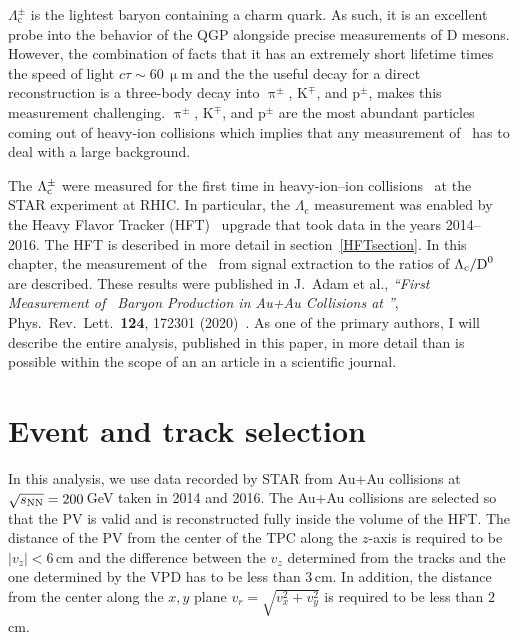         $\Lambda_\mathrm{c}^\pm$ is the lightest baryon containing a charm quark. As such, it is an excellent probe into the behavior of the QGP alongside precise measurements of D mesons. However, the combination of facts that it has an extremely short lifetime times the speed of light $c\tau \sim 60\,\upmu$m and the the useful decay for a direct reconstruction is a three-body decay into $\uppi^\pm$, K$^\mp$, and p$^\pm$, makes this measurement challenging. $\uppi^\pm$, K$^\mp$, and p$^\pm$ are the most abundant particles coming out of heavy-ion collisions which implies that any measurement of \Lambdacpm\ has to deal with a large background.

The ${\Lambda_\text{c}^\pm}$ were measured for the first time in heavy-ion--ion collisions~\cite{GuannanLc} at the STAR experiment at RHIC\@. In particular, the $\Lambda_\mathrm{c}$ measurement was enabled by the Heavy Flavor Tracker (HFT)~\cite{HFTLeo} upgrade that took data in the years 2014--2016\@. The HFT is described in more detail in section~\ref{HFTsection}\@. In this chapter, the measurement of the \Lambdac\ from signal extraction to the ratios of ${\Lambda_\text{c}}/{\text{D}^0}$ are described. These results were published in J.\ Adam et al., \emph{``First Measurement of \Lambdac\ Baryon Production in Au+Au Collisions at \snnFull''}, Phys.\ Rev.\ Lett.\ \textbf{124}, 172301 (2020)~\cite{LambdacPaper}\@. As one of the primary authors, I will describe the entire analysis, published in this paper, in more detail than is possible within the scope of an an article in a scientific journal.



\section{\label{eventAndTrackSelection}Event and track selection}
In this analysis, we use data recorded by STAR from Au+Au collisions at $\sqrt{s_\text{NN}} = 200\,$GeV taken in 2014 and 2016. The Au+Au collisions are selected so that the PV is valid and is reconstructed fully inside the volume of the HFT\@. The distance of the PV from the center of the TPC along the $z$-axis is required to be $|v_z| < 6\,$cm and the difference between the $v_z$ determined from the tracks and the one determined by the VPD has to be less than 3$\,$cm. In addition, the distance from the center along the $x,y$ plane $v_r = \sqrt{v_x^2 + v_y^2}$ is required to be less than $2\,$cm.


